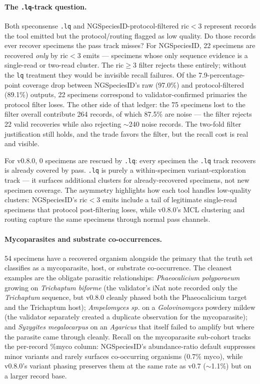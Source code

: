 \documentclass[11pt]{article}
\begin{document}
\paragraph{The \texttt{.lq}-track question.}
Both speconsense \texttt{.lq} and NGSpeciesID-protocol-filtered ric$<$3
represent records the tool emitted but the protocol/routing flagged as
low quality. Do those records ever recover specimens the pass track
misses? For NGSpeciesID, 22 specimens are recovered \emph{only} by
ric$<$3 emits --- specimens whose only sequence evidence is a
single-read or two-read cluster. The ric$\geq$3 filter rejects these
entirely; without the \texttt{lq} treatment they would be invisible
recall failures. Of the 7.9-percentage-point coverage drop between
NGSpeciesID's raw (97.0\%) and protocol-filtered (89.1\%) outputs, 22
specimens correspond to validator-confirmed primaries the protocol
filter loses. The other side of that ledger: the 75 specimens lost to
the filter overall contribute 264 records, of which 87.5\% are noise
--- the filter rejects 22 valid recoveries while also rejecting
$\sim$240 noise records. The two-fold filter justification still holds,
and the trade favors the filter, but the recall cost is real and
visible.

For v0.8.0, 0 specimens are rescued by \texttt{.lq}: every specimen
the \texttt{.lq} track recovers is already covered by pass.
\texttt{.lq} is purely a within-specimen variant-exploration track ---
it surfaces additional clusters for already-recovered specimens, not
new specimen coverage. The asymmetry highlights how each tool handles
low-quality clusters: NGSpeciesID's ric$<$3 emits include a tail of
legitimate single-read specimens that protocol post-filtering loses,
while v0.8.0's MCL clustering and routing capture the same specimens
through normal pass channels.

\paragraph{Mycoparasites and substrate co-occurrences.}
54 specimens have a recovered organism alongside the primary that the
truth set classifies as a mycoparasite, host, or substrate
co-occurrence. The cleanest examples are the obligate parasitic
relationships: \emph{Phaeocalicium polyporaeum} growing on
\emph{Trichaptum biforme} (the validator's iNat note recorded only the
\emph{Trichaptum} sequence, but v0.8.0 cleanly phased both the
Phaeocalicium target and the Trichaptum host); \emph{Ampelomyces sp.}
on a \emph{Golovinomyces} powdery mildew (the validator separately
created a duplicate observation for the mycoparasite); and
\emph{Syzygites megalocarpus} on an \emph{Agaricus} that itself failed
to amplify but where the parasite came through cleanly. Recall on the
mycoparasite sub-cohort tracks the per-record \%myco column: NGSpeciesID's
abundance-ratio default suppresses minor variants and rarely surfaces
co-occurring organisms (0.7\% myco), while v0.8.0's variant phasing
preserves them at the same rate as v0.7 ($\sim$1.1\%) but on a larger
record base.
\end{document}
